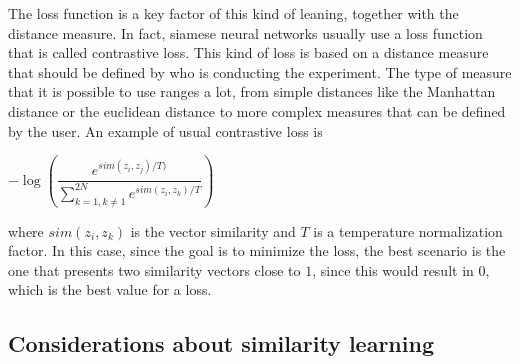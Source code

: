 \documentclass[conference]{IEEEtran}
\begin{document}
			\noindent The loss function is a key factor of this kind of leaning, together with the distance measure. In fact, siamese neural networks usually use a loss function that is called contrastive loss. This kind 
			of loss is based on a distance measure that should be defined by who is conducting the experiment. The type of measure that it is possible to use ranges a lot, from simple distances like the Manhattan distance 
			or the euclidean distance to more complex measures that can be defined by the user. An example of usual contrastive loss is 
			\begin{center}
				$-\log(\dfrac{e^{sim(z_i, z_j) / T)}}{\sum_{k=1, k\neq 1}^{2N} e^{sim(z_i, z_k) / T}})$
			\end{center}
			where $sim(z_i, z_k)$ is the vector similarity and $T$ is a temperature normalization factor. In this case, since the goal is to minimize the loss, the best scenario is the one that presents two similarity 
			vectors close to $1$, since this would result in $0$, which is the best value for a loss. 
			
		
		\subsection{Considerations about similarity learning\label{sec:csl}}
		
\end{document}
